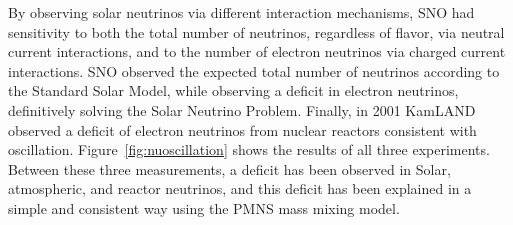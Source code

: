 \documentclass[/main.tex]{subfiles}
\begin{document}
By observing solar neutrinos via different interaction mechanisms, SNO had sensitivity to both the total number of neutrinos, regardless of flavor, via neutral current interactions, and to the number of electron neutrinos via charged current interactions.
SNO observed the expected total number of neutrinos according to the Standard Solar Model\cite{Bahcall2005}, while observing a deficit in electron neutrinos, definitively solving the Solar Neutrino Problem\cite{SNO2002}.
Finally, in 2001 KamLAND observed a deficit of electron neutrinos from nuclear reactors consistent with oscillation\cite{kamland2003}.
Figure~\ref{fig:nuoscillation} shows the results of all three experiments.
Between these three measurements, a deficit has been observed in Solar, atmospheric, and reactor neutrinos, and this deficit has been explained in a simple and consistent way using the PMNS mass mixing model.
\end{document}
